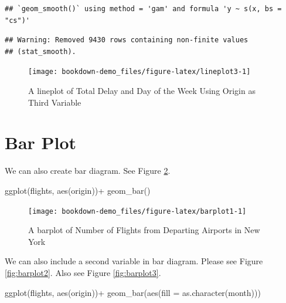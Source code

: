 \documentclass[
]{book}
\newenvironment{Shaded}{\begin{snugshade}}{\end{snugshade}}
\newcommand{\AttributeTok}[1]{\textcolor[rgb]{0.77,0.63,0.00}{#1}}
\newcommand{\FunctionTok}[1]{\textcolor[rgb]{0.00,0.00,0.00}{#1}}
\newcommand{\NormalTok}[1]{#1}
\newcommand{\SpecialCharTok}[1]{\textcolor[rgb]{0.00,0.00,0.00}{#1}}
\begin{document}
\begin{verbatim}
## `geom_smooth()` using method = 'gam' and formula 'y ~ s(x, bs = "cs")'
\end{verbatim}

\begin{verbatim}
## Warning: Removed 9430 rows containing non-finite values
## (stat_smooth).
\end{verbatim}

\begin{figure}

{\centering \texttt{[image: bookdown-demo\_files/figure-latex/lineplot3-1]} 

}

\caption{A lineplot of Total Delay and Day of the Week Using Origin as Third Variable}\label{fig:lineplot3}
\end{figure}

\hypertarget{bar-plot}{%
\section{Bar Plot}\label{bar-plot}}

We can also create bar diagram. See Figure \ref{fig:barplot1}.

\begin{Shaded}
\begin{Highlighting}[]
\FunctionTok{ggplot}\NormalTok{(flights, }\FunctionTok{aes}\NormalTok{(origin))}\SpecialCharTok{+}
  \FunctionTok{geom\_bar}\NormalTok{()}
\end{Highlighting}
\end{Shaded}

\begin{figure}

{\centering \texttt{[image: bookdown-demo\_files/figure-latex/barplot1-1]} 

}

\caption{A barplot of Number of Flights from Departing Airports in New York}\label{fig:barplot1}
\end{figure}

We can also include a second variable in bar diagram. Please see Figure \ref{fig:barplot2}. Also see Figure \ref{fig:barplot3}.

\begin{Shaded}
\begin{Highlighting}[]
\FunctionTok{ggplot}\NormalTok{(flights, }\FunctionTok{aes}\NormalTok{(origin))}\SpecialCharTok{+}
  \FunctionTok{geom\_bar}\NormalTok{(}\FunctionTok{aes}\NormalTok{(}\AttributeTok{fill =} \FunctionTok{as.character}\NormalTok{(month)))}
\end{Highlighting}
\end{Shaded}
\end{document}
